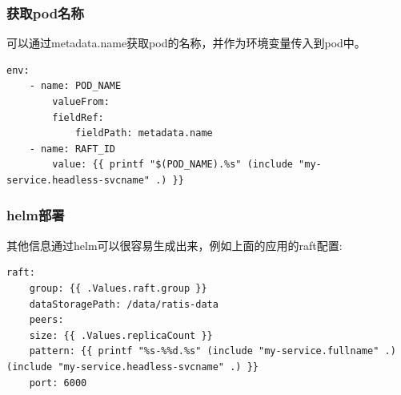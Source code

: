 \documentclass[12pt]{article}
\begin{document}
\begin{Shaded}
\begin{Highlighting}[]
\OperatorTok{\textless{}}\OperatorTok{,}\OperatorTok{\textgreater{}}\OperatorTok{=}  \OperatorTok{\textless{}\textgreater{}();}
 \OperatorTok{(}\OperatorTok{=} \OperatorTok{;}\OperatorTok{\textless{}}\OperatorTok{;}\OperatorTok{++)} \OperatorTok{\{}
    \OperatorTok{=} \OperatorTok{(}\OperatorTok{(),}\OperatorTok{);}
    \OperatorTok{=} \OperatorTok{(}\StringTok{:}\OperatorTok{,}\OperatorTok{,}\OperatorTok{());}
\OperatorTok{(}\OperatorTok{,} \OperatorTok{(}\OperatorTok{));}
\OperatorTok{\}}
\end{Highlighting}
\end{Shaded}

\subsubsection{获取pod名称}\label{ux83b7ux53d6podux540dux79f0}

可以通过metadata.name获取pod的名称，并作为环境变量传入到pod中。

\begin{verbatim}
env:
    - name: POD_NAME
        valueFrom:
        fieldRef:
            fieldPath: metadata.name
    - name: RAFT_ID
        value: {{ printf "$(POD_NAME).%s" (include "my-service.headless-svcname" .) }}
\end{verbatim}

\subsubsection{helm部署}\label{helmux90e8ux7f72}

其他信息通过helm可以很容易生成出来，例如上面的应用的raft配置:

\begin{verbatim}
raft:
    group: {{ .Values.raft.group }}
    dataStoragePath: /data/ratis-data
    peers:
    size: {{ .Values.replicaCount }}
    pattern: {{ printf "%s-%%d.%s" (include "my-service.fullname" .) (include "my-service.headless-svcname" .) }}
    port: 6000
\end{verbatim}
\end{document}
